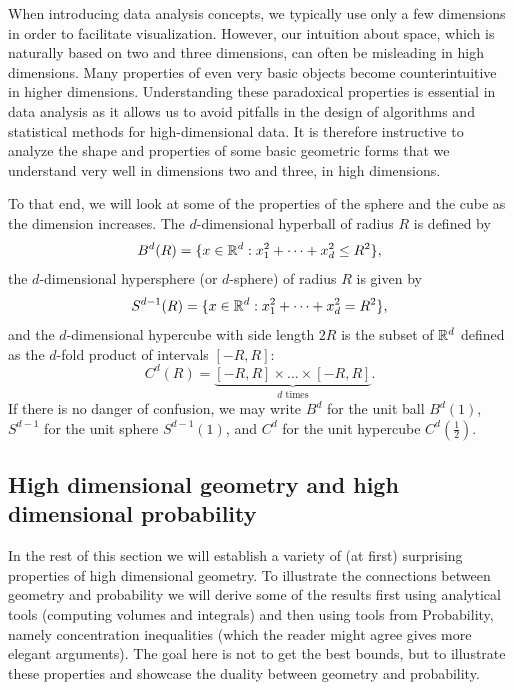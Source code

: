 When introducing data analysis concepts, we typically use only a few dimensions in order to facilitate visualization.
However, our intuition about space, which is naturally based on two and three dimensions, can often be misleading in high dimensions.
Many properties of even very basic objects become counterintuitive in higher dimensions. Understanding these paradoxical properties is essential
in data analysis as it allows us to avoid pitfalls in the design of algorithms and statistical methods for high-dimensional data.
It is therefore instructive to analyze the shape and properties of some basic geometric forms that we understand very well
in dimensions two and three, in high dimensions.

To that end, we will look at some of the
properties of the sphere and the cube as the dimension increases.
The $d$-dimensional hyperball of radius $R$ is defined by
$$B^d(R) =\{x \in \mathbb{R}^d : x_1^2 + \dots +x_d^2 \le R^2\},$$ the $d$-dimensional hypersphere (or $d$-sphere) of radius $R$ is given by
$$S^{d-1}(R) =\{x \in \mathbb{R}^d : x_1^2 + \dots +x_d^2 = R^2\},$$
and the $d$-dimensional hypercube with side length $2R$  is the subset of $\mathbb{R}^d$ defined as the $d$-fold product of
intervals $[-R, R]$:
$$C^d(R) = \underbrace{ [-R,R] \times  \dots  \times [-R,R]}_{\text{$d$ times}}.$$
If there is no danger of confusion, we may write $B^d$ for the unit ball $B^d(1)$, $S^{d-1}$ for the unit sphere $S^{d-1}(1)$, and
$C^d$ for the unit hypercube $C^d(\frac{1}{2})$.



\subsection{High dimensional geometry and high dimensional probability} 

In the rest of this section we will establish a variety of (at first) surprising properties of high dimensional geometry. To illustrate the connections between geometry and probability we will derive some of the results first using analytical tools (computing volumes and integrals) and then using tools from Probability, namely concentration inequalities (which the reader might agree gives more elegant arguments). The goal here is not to get the best bounds, but to illustrate these properties and showcase the duality between geometry and probability.

